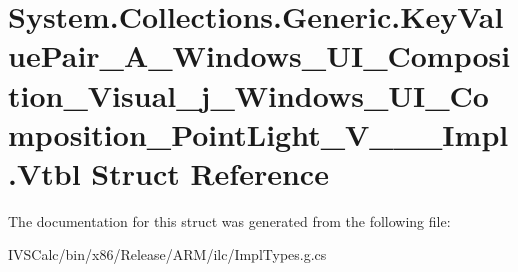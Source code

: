 \hypertarget{struct_system_1_1_collections_1_1_generic_1_1_key_value_pair___a___windows___u_i___composition__567ed780acc833b9612400a94ffe6034}{}\section{System.\+Collections.\+Generic.\+Key\+Value\+Pair\+\_\+\+A\+\_\+\+Windows\+\_\+\+U\+I\+\_\+\+Composition\+\_\+\+Visual\+\_\+j\+\_\+\+Windows\+\_\+\+U\+I\+\_\+\+Composition\+\_\+\+Point\+Light\+\_\+\+V\+\_\+\+\_\+\+\_\+\+Impl.\+Vtbl Struct Reference}
\label{struct_system_1_1_collections_1_1_generic_1_1_key_value_pair___a___windows___u_i___composition__567ed780acc833b9612400a94ffe6034}


The documentation for this struct was generated from the following file\+:\begin{DoxyCompactItemize}
\item 
I\+V\+S\+Calc/bin/x86/\+Release/\+A\+R\+M/ilc/Impl\+Types.\+g.\+cs\end{DoxyCompactItemize}

